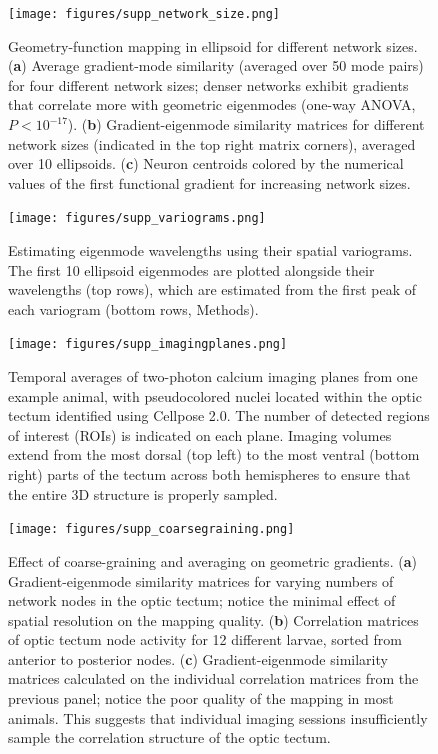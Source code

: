 \documentclass{article}
\begin{document}
\newpage

\begin{figure}[t]
    \centering
    \texttt{[image: figures/supp\_network\_size.png]}
    \caption{Geometry-function mapping in ellipsoid for different network sizes. (\textbf{a}) Average gradient-mode similarity (averaged over 50 mode pairs) for four different network sizes; denser networks exhibit gradients that correlate more with geometric eigenmodes (one-way ANOVA, $P<10^{-17}$). (\textbf{b}) Gradient-eigenmode similarity matrices for different network sizes (indicated in the top right matrix corners), averaged over 10 ellipsoids. (\textbf{c}) Neuron centroids colored by the numerical values of the first functional gradient for increasing network sizes.}
    \label{supp_network_size}
\end{figure}

\newpage

\begin{figure}[t]
    \centering
    \texttt{[image: figures/supp\_variograms.png]}
    \caption{Estimating eigenmode wavelengths using their spatial variograms. The first 10 ellipsoid eigenmodes are plotted alongside their wavelengths (top rows), which are estimated from the first peak of each variogram (bottom rows, Methods).}
    \label{supp_variograms}
\end{figure}

\newpage

\begin{figure}[t]
    \centering
    \texttt{[image: figures/supp\_imagingplanes.png]}
    \caption{Temporal averages of two-photon calcium imaging planes from one example animal, with pseudocolored nuclei located within the optic tectum identified using Cellpose 2.0. The number of detected regions of interest (ROIs) is indicated on each plane. Imaging volumes extend from the most dorsal (top left) to the most ventral (bottom right) parts of the tectum across both hemispheres to ensure that the entire 3D structure is properly sampled.}
    \label{supp_imagingplanes}
\end{figure}

\newpage

\begin{figure}[t]
    \centering
    \texttt{[image: figures/supp\_coarsegraining.png]}
    \caption{Effect of coarse-graining and averaging on geometric gradients. (\textbf{a}) Gradient-eigenmode similarity matrices for varying numbers of network nodes in the optic tectum; notice the minimal effect of spatial resolution on the mapping quality. (\textbf{b}) Correlation matrices of optic tectum node activity for 12 different larvae, sorted from anterior to posterior nodes. (\textbf{c}) Gradient-eigenmode similarity matrices calculated on the individual correlation matrices from the previous panel; notice the poor quality of the mapping in most animals. This suggests that individual imaging sessions insufficiently sample the correlation structure of the optic tectum.}
    \label{supp_coarsegraining}
\end{figure}
\end{document}
